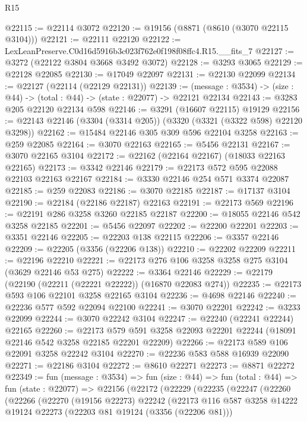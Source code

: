 \begin{lexlean}{R15}
\begin{coremodule}
@22115 := @22114 @3072
@22120 := @19156 (@8871 (@8610 (@3070 @22115 @3104)))
@22121 := @22111 @22120
@22122 := LexLeanPreserve.C0d16d5916b3c023f762e0f198f08ffc4.R15.__fits_7
@22127 := @3272 (@22122 @3804 @3668 @3492 @3072)
@22128 := @3293 @3065
@22129 := @22128 @22085
@22130 := @17049 @22097
@22131 := @22130 @22099
@22134 := @22127 (@22114 (@22129 @22131))
@22139 := (message : @3534) -> (size : @44) -> (total : @44) -> (state : @22077) -> @22121 @22134
@22143 := @3283 @205 @22120 @22134 @598
@22146 := @3291 (@16607 @22115) @19129
@22156 := @22143 @22146 (@3304 (@3314 @205)) (@3320 (@3321 (@3322 @598) @22120 @3298))
@22162 := @15484 @22146 @305 @309 @596 @22104 @3258
@22163 := @259 @22085
@22164 := @3070 @22163
@22165 := @5456 @22131
@22167 := @3070 @22165 @3104
@22172 := @22162 (@22164 @22167) (@18033 @22163 @22165)
@22173 := @3342 @22146
@22179 := @22173 @572 @595 @22088 @22103 @22163 @22167
@22184 := @3330 @22146 @254 @571 @3374 @22087
@22185 := @259 @22083
@22186 := @3070 @22185
@22187 := @17137 @3104
@22190 := @22184 (@22186 @22187) @22163
@22191 := @22173 @569
@22196 := @22191 @286 @3258 @3260 @22185 @22187
@22200 := @18055 @22146 @542 @3258 @22185
@22201 := @5456 @22097
@22202 := @22200 @22201
@22203 := @3351 @22146
@22205 := @22203 @138 @22115
@22206 := @3357 @22146
@22209 := @22205 (@3356 (@22206 @138))
@22210 := @22202 @22209
@22211 := @22196 @22210
@22221 := @22173 @276 @106 @3258 @3258 @275 @3104 (@3629 @22146 @53 @275)
@22222 := @3364 @22146
@22229 := @22179 (@22190 (@22211 (@22221 @22222)) (@16870 @22083 @274))
@22235 := @22173 @593 @106 @22101 @3258 @22165 @3104
@22236 := @4698 @22146
@22240 := @22236 @577 @592 @22094 @22100
@22241 := @3070 @22201
@22242 := @3233 @22099
@22244 := @3070 @22242 @3104
@22247 := @22240 (@22241 @22244) @22165
@22260 := @22173
    @579
    @591
    @3258
    @22093
    @22201
    @22244
    (@18091 @22146 @542 @3258 @22185 @22201 @22209)
@22266 := @22173 @589 @106 @22091 @3258 @22242 @3104
@22270 := @22236 @583 @588 @16939 @22090
@22271 := @22186 @3104
@22272 := @8610 @22271
@22273 := @8871 @22272
@22349 := fun (message : @3534) =>
  fun (size : @44) =>
  fun (total : @44) =>
  fun (state : @22077) =>
  @22156
    (@22172
      (@22229
        (@22235
          (@22247
            (@22260
              (@22266
                (@22270
                  (@19156 @22273)
                  @22242
                  (@22173
                    @116
                    @587
                    @3258
                    @14222
                    @19124
                    @22273
                    (@22203 @81 @19124 (@3356 (@22206 @81)))

\end{coremodule}
\end{lexlean}
